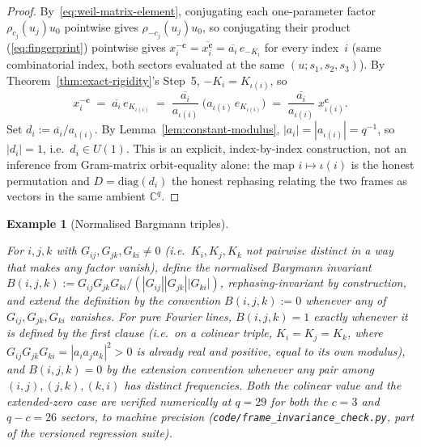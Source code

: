\documentclass[11pt,a4paper]{article}
\newtheorem{example}[theorem]{Example}
\begin{document}
    \begin{proof}
      By~\eqref{eq:weil-matrix-element}, conjugating each one-parameter factor
      $\rho_{c_j}(u_j)u_0$ pointwise gives $\rho_{-c_j}(u_j)u_0$, so conjugating their product
      (\eqref{eq:fingerprint}) pointwise gives $x_i^{-\mathbf c} = \overline{x_i^{\mathbf c}} =
      \overline{a_i}\, e_{-K_i}$ for every index~$i$ (same combinatorial index, both sectors
      evaluated at the same $(u;s_1,s_2,s_3)$). By Theorem~\ref{thm:exact-rigidity}'s Step~5,
      $-K_i = K_{\iota(i)}$, so
      \begin{equation}
        x_i^{-\mathbf c} \;=\; \overline{a_i}\, e_{K_{\iota(i)}}
        \;=\; \frac{\overline{a_i}}{a_{\iota(i)}}\; \bigl(a_{\iota(i)}\, e_{K_{\iota(i)}}\bigr)
        \;=\; \frac{\overline{a_i}}{a_{\iota(i)}}\; x_{\iota(i)}^{\mathbf c}.
      \end{equation}
      Set $d_i := \overline{a_i}/a_{\iota(i)}$. By Lemma~\ref{lem:constant-modulus},
      $|a_i| = |a_{\iota(i)}| = q^{-1}$, so $|d_i|=1$, i.e.\ $d_i \in U(1)$. This is an explicit,
      index-by-index construction, not an inference from Gram-matrix orbit-equality alone: the map
      $i \mapsto \iota(i)$ is the honest permutation and $D = \mathrm{diag}(d_i)$ the honest rephasing
      relating the two frames as vectors in the same ambient $\mathbb{C}^q$.
    \end{proof}

    \begin{example}[Normalised Bargmann triples]
      \label{ex:bargmann}
      \begin{sloppypar}
      For $i,j,k$ with $G_{ij}, G_{jk}, G_{ki} \neq 0$ (i.e.\ $K_i,K_j,K_k$ not pairwise distinct in a
      way that makes any factor vanish), define the normalised Bargmann invariant
      $B(i,j,k) := G_{ij}G_{jk}G_{ki} / (|G_{ij}||G_{jk}||G_{ki}|)$, rephasing-invariant by
      construction, and extend the definition by the convention $B(i,j,k) := 0$ whenever any of
      $G_{ij},G_{jk},G_{ki}$ vanishes. For pure Fourier lines, $B(i,j,k)=1$ exactly whenever it is
      defined by the first clause (i.e.\ on a colinear triple, $K_i=K_j=K_k$, where
      $G_{ij}G_{jk}G_{ki} = |a_ia_ja_k|^2 > 0$ is already real and positive, equal to its own
      modulus), and $B(i,j,k)=0$ by the extension convention whenever any pair among $(i,j),(j,k),
      (k,i)$ has distinct frequencies. Both the colinear value and the extended-zero case are verified
      numerically at $q=29$ for both the $c=3$ and $q-c=26$ sectors, to machine precision
      (\texttt{code/\allowbreak frame\_invariance\_check.py}, part of the versioned regression suite).
      \end{sloppypar}
    \end{example}
\end{document}
